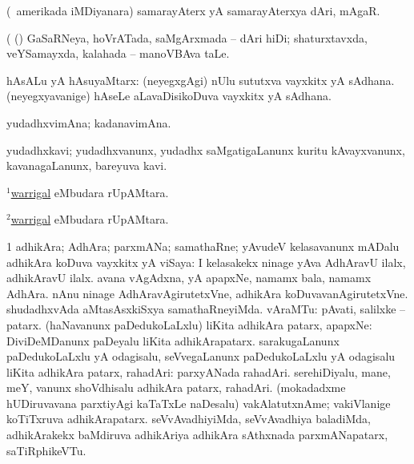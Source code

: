 \bentry
{} 
\gl{\nA}
\expl{}
\bmng
(\kanu\ amerikada iMDiyanara) samarayAterx yA samarayAterxya dAri, mAgaR. 
\emng

\noindent 
\gl{\pagu}
\expl{}
\bmng
{} (  (\rUpa) GaSaRNeya, hoVrATada, saMgArxmada -- dAri hiDi; shaturxtavxda, veYSamayxda, kalahada -- manoVBAva taLe. 
\emng
\eentry

\bentry
{} 
\gl{\nA}
\expl{}
\bmng
hAsALu yA hAsuyaMtarx: 
\banum
{} (neyegxgAgi) nUlu sututxva vayxkitx yA sAdhana. 
 (neyegxyavanige) hAseLe aLavaDisikoDuva vayxkitx yA sAdhana. 
\eanum
\emng
\eentry

\bentry
{} 
\gl{\nA}
\expl{}
\bmng
yudadhxvimAna; kadanavimAna. 
\emng
\eentry

\bentry
{} 
\gl{\nA}
\expl{}
\bmng
yudadhxkavi; yudadhxvanunx, yudadhx saMgatigaLanunx kuritu kAvayxvanunx, kavanagaLanunx, bareyuva kavi. 
\emng
\eentry

\bentry
{} 
\gl{\nA}
\expl{}
\bmng
\hyperlink{warrigal(1)}{$^1$warrigal} eMbudara rUpAMtara. 
\emng
\eentry

\bentry
{} 
\gl{\gu}
\expl{}
\bmng
\hyperlink{warrigal(2)}{$^2$warrigal} eMbudara rUpAMtara. 
\emng
\eentry

\bentry
{} 
\gl{\nA}
\expl{}
\bmng
\bnum
\num{1} adhikAra; AdhAra; parxmANa; samathaRne; yAvudeV kelasavanunx mADalu adhikAra koDuva vayxkitx yA viSaya:  I kelasakekx ninage yAva AdhAravU ilalx, adhikAravU ilalx.  avana vAgAdxna, yA apapxNe, namamx bala, namamx AdhAra.  nAnu ninage AdhAravAgirutetxVne, adhikAra koDuvavanAgirutetxVne.  shudadhxvAda aMtasAsxkiSxya samathaRneyiMda. 
 vAraMTu: 
\banum
{} pAvati, salilxke -- patarx. 
 (haNavanunx paDedukoLaLxlu) liKita adhikAra patarx, apapxNe:  DiviDeMDanunx paDeyalu liKita adhikArapatarx. 
 sarakugaLanunx paDedukoLaLxlu yA odagisalu, seVvegaLanunx paDedukoLaLxlu yA odagisalu liKita adhikAra patarx, rahadAri:  parxyANada rahadAri. 
 serehiDiyalu, mane, meY, \mo vanunx shoVdhisalu adhikAra patarx, rahadAri. 
 (mokadadxme hUDiruvavana parxtiyAgi kaTaTxLe naDesalu) vakAlatutxnAme; vakiVlanige koTiTxruva adhikArapatarx. 
 seVvAvadhiyiMda, seVvAvadhiya baladiMda, adhikArakekx baMdiruva adhikAriya adhikAra sAthxnada parxmANapatarx, saTiRphikeVTu. 
\eanum
\numie
\enum
\emng
\eentry

